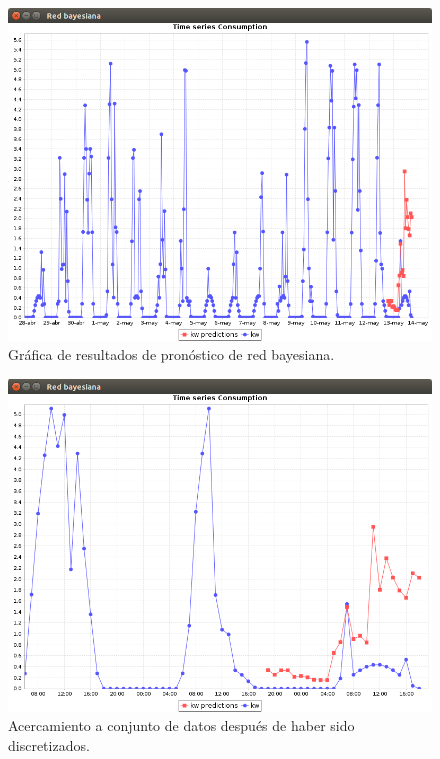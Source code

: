 \begin{figure}[!h]
	\centering
	\includegraphics[width=13.5cm]{img/redBayesianaRes.png}
	\caption{Gráfica de resultados de pronóstico de red bayesiana.}
	\label{fig:redBayesianaRes}
\end{figure}

\begin{figure}[ht]
	\centering
	\includegraphics[width=13.5cm]{img/redBayesianaResZoom.png}
	\caption{Acercamiento a conjunto de datos después de haber sido discretizados.}
	\label{fig:redBayesianaResZoom}
\end{figure}

